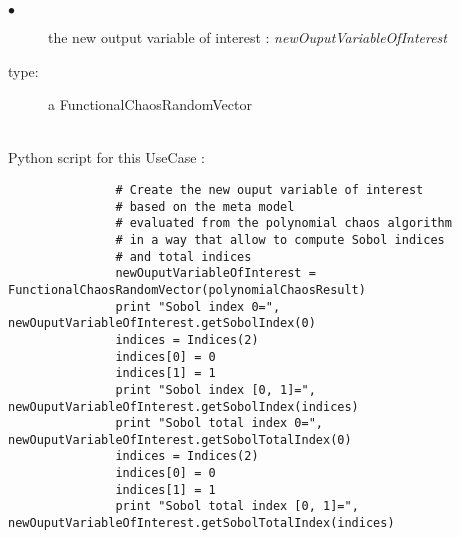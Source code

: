              {
               \begin{description}
               \item[$\bullet$] the new output variable of interest : {\itshape newOuputVariableOfInterest}
               \item[type:] a FunctionalChaosRandomVector
               \end{description}
             }

             \textspace\\
             Python script for this UseCase :

             \begin{lstlisting}
               # Create the new ouput variable of interest
               # based on the meta model
               # evaluated from the polynomial chaos algorithm
               # in a way that allow to compute Sobol indices
               # and total indices
               newOuputVariableOfInterest = FunctionalChaosRandomVector(polynomialChaosResult)
               print "Sobol index 0=", newOuputVariableOfInterest.getSobolIndex(0)
               indices = Indices(2)
               indices[0] = 0
               indices[1] = 1
               print "Sobol index [0, 1]=", newOuputVariableOfInterest.getSobolIndex(indices)
               print "Sobol total index 0=", newOuputVariableOfInterest.getSobolTotalIndex(0)
               indices = Indices(2)
               indices[0] = 0
               indices[1] = 1
               print "Sobol total index [0, 1]=", newOuputVariableOfInterest.getSobolTotalIndex(indices)

             \end{lstlisting}
